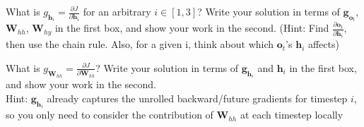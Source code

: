 \documentclass[11pt,addpoints,answers]{exam}
\newcommand{\gv}{\mathbf{g}}
\newcommand{\hv}{\mathbf{h}}
\newcommand{\ov}{\mathbf{o}}
\newcommand{\Wv}{\mathbf{W}}
\begin{document}
\begin{questions}
\begin{parts}
\begin{subparts}
\begin{subsubparts}
    \begin{your_solution}[title=$\frac{\partial J}{\partial \ov_t}$,height=2.5cm,width=8.5cm]
    \end{your_solution}
    
    \begin{your_solution}[title=Work,height=5.5cm,width=14cm]
    \end{your_solution}


    \subsubpart[3] What is $g_{\hv_i} = \frac{\partial J}{\partial \hv_i}$ for an arbitrary $i \in [1,3]$? Write your solution in terms of $\gv_{\ov_t}$, $\Wv_{hh}$, $\Wv_{hy}$ in the first box, and show your work in the second. (Hint: Find $\frac{\partial \ov_t}{\partial \hv_i}$, then use the chain rule. Also, for a given i, think about which $\ov_t$'s  $\hv_i$ affects)
        
    \begin{your_solution}[title=$\frac{\partial J}{\partial \hv_i}$,height=2.5cm,width=8.5cm]
    \end{your_solution}
    
    \begin{your_solution}[title=Work,height=6cm,width=14cm]
    \end{your_solution}

    \clearpage
    
    \subsubpart[2] What is $g_{\Wv_{hh}} = \frac{\partial J}{\partial \Wv_{hh}}$? Write your solution in terms of $\gv_{\hv_i}$ and $\hv_i$ in the first box, and show your work in the second. \\
    Hint: $\gv_{\hv_i}$  already captures the unrolled backward/future gradients for timestep $i$, so you only need to consider the contribution of $\Wv_{hh}$ at each timestep locally
    
    
    \begin{your_solution}[title=$\frac{\partial J}{\partial \Wv_{hh}}$,height=2.5cm,width=10.5cm]
    \end{your_solution}
    
    \begin{your_solution}[title=Work,height=6cm,width=14cm]
        
    
    

    \end{your_solution}

    
    \end{subsubparts}
    

\end{subparts}
\end{parts}
\end{questions}
\end{document}
